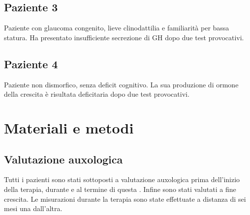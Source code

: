 \clearpage

\subsection*{Paziente 3}%

Paziente con glaucoma congenito, lieve clinodattilia e familiarità per bassa statura. Ha presentato insufficiente secrezione di GH  dopo due test provocativi.

\clearpage

\subsection*{Paziente 4}%

Paziente non dismorfico, senza deficit cognitivo. La sua produzione di ormone della crescita è risultata deficitaria dopo due test provocativi.

\clearpage



\section{Materiali e metodi}

\subsection{Valutazione auxologica}
Tutti i pazienti sono stati sottoposti a valutazione auxologica prima dell'inizio della terapia, durante e al termine di questa . Infine sono stati valutati a fine crescita. Le misurazioni durante la terapia sono state effettuate a distanza di sei mesi una dall'altra.

